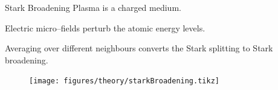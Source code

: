 \documentclass[dvipsnames]{beamer}
\begin{document}
% 
%   
% 
\begin{frame}{Stark Broadening}
 Plasma is a charged medium.

 Electric micro--fields perturb the atomic energy levels.

 Averaging over different neighbours converts the Stark splitting to Stark broadening.
\begin{figure}
 \texttt{[image: figures/theory/starkBroadening.tikz]}
\end{figure}
\end{frame}
\end{document}
